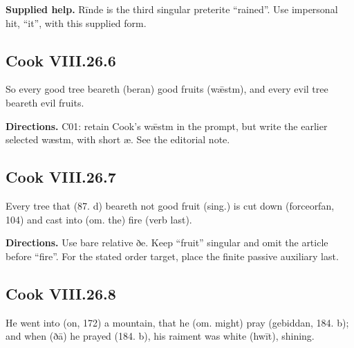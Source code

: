 \textbf{Supplied help.} Rīnde is the third singular preterite “rained”. Use impersonal hit, “it”, with this supplied form.

\par\begin{minipage}{\linewidth}\raggedright
\subsection*{Cook VIII.26.6}

So every good tree beareth (beran) good fruits (wǣstm), and every evil tree beareth evil fruits.

\textbf{Directions.} C01: retain Cook’s wǣstm in the prompt, but write the earlier selected wæstm, with short æ. See the editorial note.

\end{minipage}\par\addvspace{4pt}

\par\begin{minipage}{\linewidth}\raggedright
\subsection*{Cook VIII.26.7}

Every tree that (87. d) beareth not good fruit (sing.) is cut down (forceorfan, 104) and cast into (om. the) fire (verb last).

\textbf{Directions.} Use bare relative ðe. Keep “fruit” singular and omit the article before “fire”. For the stated order target, place the finite passive auxiliary last.

\end{minipage}\par\addvspace{4pt}

\par\begin{minipage}{\linewidth}\raggedright
\subsection*{Cook VIII.26.8}

He went into (on, 172) a mountain, that he (om. might) pray (gebiddan, 184. b); and when (ðā) he prayed (184. b), his raiment was white (hwīt), shining.

\end{minipage}\par\addvspace{4pt}

